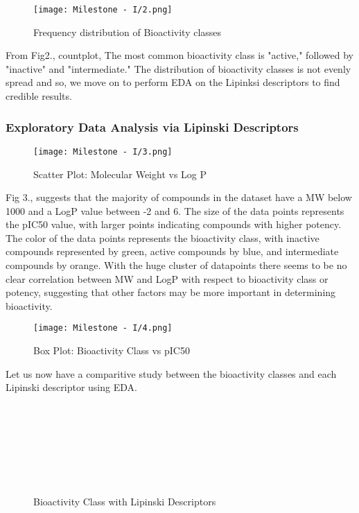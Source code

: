 \documentclass[fleqn,10pt]{SelfArx} %
\begin{document}
\begin{figure}[h!]
    \centering
    \texttt{[image: Milestone - I/2.png]}
    \caption{Frequency distribution of Bioactivity classes}
    \label{fig:Frequency distribution of Bioactivity classes}
\end{figure}

From Fig2., countplot, The most common bioactivity class is "active," followed by "inactive" and "intermediate." The distribution of bioactivity classes is not evenly spread and so, we move on to perform EDA on the Lipinksi descriptors to find credible results. 
\subsubsection{Exploratory Data Analysis via Lipinski Descriptors}
\begin{figure}[h!]
    \centering
    \texttt{[image: Milestone - I/3.png]}
    \caption{Scatter Plot: Molecular Weight vs Log P}
    \label{fig:Scatter Plot: Molecular Weight vs Log P}
\end{figure}

Fig 3., suggests that the majority of compounds in the dataset have a MW below 1000 and a LogP value between -2 and 6. The size of the data points represents the pIC50 value, with larger points indicating compounds with higher potency. The color of the data points represents the bioactivity class, with inactive compounds represented by green, active compounds by blue, and intermediate compounds by orange. With the huge cluster of datapoints there seems to be no clear correlation between MW and LogP with respect to bioactivity class or potency, suggesting that other factors may be more important in determining bioactivity.



\begin{figure}[h!]
    \centering
    \texttt{[image: Milestone - I/4.png]}
    \caption{Box Plot: Bioactivity Class vs pIC50}
    \label{fig:Box Plot: Bioactivity Class vs pIC50}
\end{figure}
Let us now have a comparitive study between the bioactivity classes and each Lipinski descriptor using EDA. 
\\\\\\\\\\\\
\begin{figure}[ht]
  \centering
  \hfill
  \\
  \hfill
  \caption{Bioactivity Class with Lipinski Descriptors}
  \label{Bioactivity Class with Lipinski Descriptors}
\end{figure}
\end{document}
